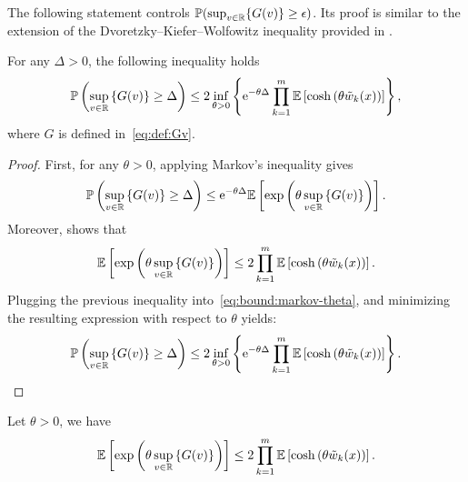  The following statement controls $\mathbb{P}({\sup_{v \in \mathbb{R}}\{{G(v)}\} \ge \epsilon})$. Its proof is similar to the extension of the Dvoretzky--Kiefer--Wolfowitz inequality provided in \cite[Appendix~B]{plassier2024efficient}.

  \begin{lemma}\label{lem:bound:DKW-revisited}
      For any  $\Delta>0$, the following inequality holds
      \begin{equation*}
          \mathbb{P}\left({\sup_{v \in \mathbb{R}}\left\{{G(v)}\right\} \ge \Delta}\right)
          \le 2 \inf _{\theta>0} \left\{{\mathrm{e}^{- \theta \Delta} \prod_{k=1}^{m} \mathbb{E}\left[{\cosh\left({\theta \tilde{w}_{k}(x)}\right)}\right]}\right\},
      \end{equation*}
      where $G$ is defined in~\eqref{eq:def:Gv}.
  \end{lemma}

  \begin{proof}
      First, for any $\theta>0$, applying Markov's inequality gives
      \begin{equation}\label{eq:bound:markov-theta}
          \mathbb{P}\left({\sup_{v \in \mathbb{R}} \left\{{G(v)}\right\} \ge \Delta}\right)
          \le \mathrm{e}^{-\theta \Delta} \mathbb{E}\left[{\exp \left({\theta \sup_{v \in \mathbb{R}} \left\{{G(v)}\right\}}\right)}\right].
      \end{equation}
      Moreover,  shows that
      \begin{equation*}%
          \E\br{\exp \pr{\theta \sup_{v \in \R}\ac{G(v)}}} 
          \le 2 \prod_{k=1}^{\ccount} \E\br{\cosh\pr{\theta \tilde{w}_{k}(x)}}.
      \end{equation*}
      Plugging the previous inequality into~\eqref{eq:bound:markov-theta}, and minimizing the resulting expression with respect to $\theta$ yields:
      \begin{equation*}
          \mathbb{P}\left({\sup_{v \in \mathbb{R}}\left\{{G(v)}\right\} \ge \Delta}\right)
          \le 2 \inf _{\theta>0} \left\{{\mathrm{e}^{- \theta \Delta} \prod_{k=1}^{m} \mathbb{E}\left[{\cosh\left({\theta \tilde{w}_{k}(x)}\right)}\right]}\right\}.
      \end{equation*}
  \end{proof}

  \begin{lemma}\label{lem:bound:symmetrization}
    Let $\theta>0$, we have
    \begin{equation*}
        \mathbb{E}\left[{\exp\left({\theta \sup_{v \in \mathbb{R}}\left\{{G(v)}\right\}}\right)}\right]
        \le 2 \prod_{k=1}^{m} \mathbb{E}\left[{\cosh\left({\theta \tilde{w}_{k}(x)}\right)}\right].
    \end{equation*}
  \end{lemma}

